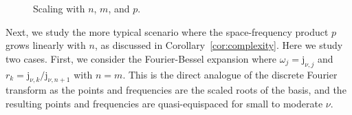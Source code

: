 \begin{figure}[!t]
\begin{subfigure}[b]{0.32\textwidth}
  \end{subfigure}
  \hfill 
  \begin{subfigure}[b]{0.32\textwidth}
  \end{subfigure}
  \caption{Scaling with $n$, $m$, and $p$.}
  \label{fig:nmp-scaling}
\end{figure}


Next, we study the more typical scenario where the space-frequency product $p$
grows linearly with $n$, as discussed in Corollary~\ref{cor:complexity}. Here we
study two cases. First, we consider the Fourier-Bessel expansion where $\omega_j
= \mathrm{j}_{\nu, j}$ and $r_k = \mathrm{j}_{\nu, k}/\mathrm{j}_{\nu, n+1}$
with $n = m$. This is the direct analogue of the discrete Fourier transform as
the points and frequencies are the scaled roots of the basis, and the resulting
points and frequencies are quasi-equispaced for small to moderate $\nu$. 

